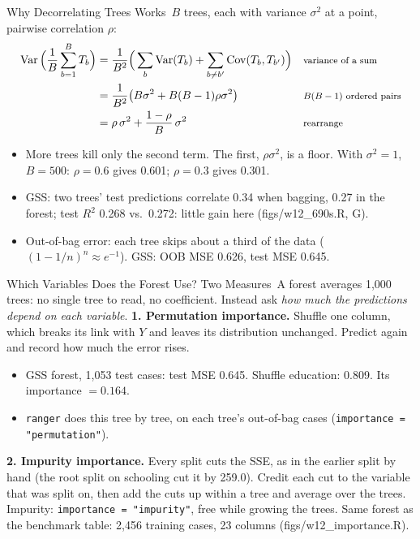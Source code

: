 \documentclass[aspectratio=169,11pt,xcolor=dvipsnames]{beamer}
\newcommand{\srcp}[1]{{\scriptsize\color{gray}(#1)}}
\DeclareMathOperator{\Cov}{Cov}
\DeclareMathOperator{\Var}{Var}
\newcommand{\adv}{\,\raisebox{0.6pt}{\textcolor{accent}{$\bigstar$}}}
\newcommand{\core}{\,\raisebox{0.6pt}{\textcolor{corestar}{$\bigstar$}}}
\begin{document}
\begin{frame}{Why Decorrelating Trees Works\adv}
$B$ trees, each with variance $\sigma^2$ at a point, pairwise correlation $\rho$:
\begin{align*}
  \Var\Big(\frac1B\sum_{b=1}^B T_b\Big)
  &= \frac{1}{B^2}\Big(\sum_b \Var(T_b) + \sum_{b\neq b'}\Cov(T_b, T_{b'})\Big)
   && \text{\footnotesize variance of a sum} \\
  &= \frac{1}{B^2}\big(B\sigma^2 + B(B-1)\rho\sigma^2\big)
   && \text{\footnotesize $B(B-1)$ ordered pairs} \\
  &= \rho\,\sigma^2 + \frac{1-\rho}{B}\,\sigma^2
   && \text{\footnotesize rearrange}
\end{align*}
\begin{itemize}\itemsep1pt\small
  \item More trees kill only the second term. The first, $\rho\sigma^2$, is a floor.
        With $\sigma^2 = 1$, $B = 500$: $\rho = 0.6$ gives 0.601; $\rho = 0.3$ gives 0.301.
  \item GSS: two trees' test predictions correlate 0.34 when bagging, 0.27 in the
        forest; test $R^2$ 0.268 vs.\ 0.272: little gain here \srcp{figs/w12\_690s.R, G}.
  \item Out-of-bag error: each tree skips about a third of the data
        ($(1-1/n)^n \approx e^{-1}$). GSS: OOB MSE 0.626, test MSE 0.645.
\end{itemize}
\end{frame}

\begin{frame}{Which Variables Does the Forest Use? Two Measures\core}
A forest averages 1,000 trees: no single tree to read, no coefficient. Instead ask
\emph{how much the predictions depend on each variable}.
\vskip3pt
\textbf{1. Permutation importance.} Shuffle one column, which breaks its link with $Y$ and
leaves its distribution unchanged. Predict again and record how much the error rises.
\begin{itemize}\itemsep1pt\small
  \item GSS forest, 1,053 test cases: test MSE 0.645. Shuffle education: 0.809. Its importance $= 0.164$.
  \item \texttt{ranger} does this tree by tree, on each tree's out-of-bag cases
        (\texttt{importance = "permutation"}).
\end{itemize}
\vskip3pt
\textbf{2. Impurity importance.} Every split cuts the SSE, as in the earlier split by hand
(the root split on schooling cut it by 259.0). Credit each cut to the variable that was split on,
then add the cuts up within a tree and average over the trees.
\vskip3pt
{\footnotesize Impurity: \texttt{importance = "impurity"}, free while growing the trees. Same forest as the benchmark table: 2,456 training cases, 23 columns
\srcp{figs/w12\_importance.R}.}
\end{frame}
\end{document}
